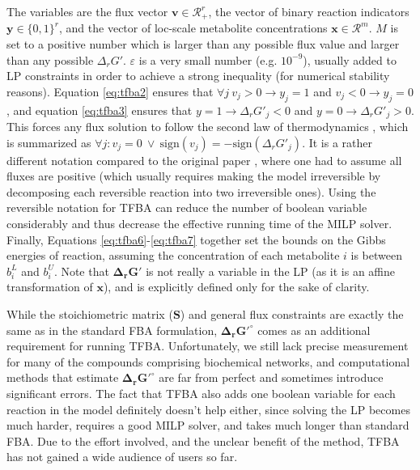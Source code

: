\documentclass[twocolumn]{bmcart}%
\begin{document}
The variables are the flux vector $\mathbf{v} \in \mathcal{R}_{+}^{r}$, the vector of binary reaction indicators $\mathbf{y} \in \{0,1\}^{r}$, and the vector of loc-scale metabolite concentrations $\mathbf{x} \in \mathcal{R}^{m}$. $M$ is set to a positive number which is larger than any possible flux value and larger than any possible $\Delta_r G'$. $\varepsilon$ is a very small number (e.g. $10^{-9}$), usually added to LP constraints in order to achieve a strong inequality (for numerical stability reasons). Equation \ref{eq:tfba2} ensures that $\forall j~v_j > 0 \rightarrow y_j = 1$ and $v_j < 0 \rightarrow y_j = 0$, and equation \ref{eq:tfba3} ensures that $y = 1 \rightarrow \Delta_r G'_j < 0$ and $y = 0 \rightarrow \Delta_r G'_j > 0$. This forces any flux solution to follow the second law of thermodynamics \cite{Hoppe2007-sw, Machado2017-gh}, which is summarized as $\forall j:v_j = 0~\vee~\text{sign}(v_j) = -\text{sign}(\Delta_r G'_j)$. It is a rather different notation compared to the original paper \cite{Henry2007-xp}, where one had to assume all fluxes are positive (which usually requires making the model irreversible by decomposing each reversible reaction into two irreversible ones). Using the reversible notation for TFBA can reduce the number of boolean variable considerably and thus decrease the effective running time of the MILP solver.
Finally, Equations \ref{eq:tfba6}-\ref{eq:tfba7} together set the bounds on the Gibbs energies of reaction, assuming the concentration of each metabolite $i$ is between $b^L_i$ and $b^U_i$. Note that $\mathbf{\Delta_r G'}$ is not really a variable in the LP (as it is an affine transformation of $\mathbf{x}$), and is explicitly defined only for the sake of clarity. 

While the stoichiometric matrix ($\mathbf{S}$) and general flux constraints are exactly the same as in the standard FBA formulation, $\mathbf{\Delta_r G'^\circ}$ comes as an additional requirement for running TFBA. Unfortunately, we still lack precise measurement for many of the compounds comprising biochemical networks, and computational methods that estimate $\mathbf{\Delta_r G'^\circ}$ \cite{Jankowski2008-hd,Noor2012-mp,Noor2013-an,Jinich2014-nv} are far from perfect and sometimes introduce significant errors. The fact that TFBA also adds one boolean variable for each reaction in the model definitely doesn't help either, since solving the LP becomes much harder, requires a good MILP solver, and takes much longer than standard FBA. Due to the effort involved, and the unclear benefit of the method, TFBA has not gained a wide audience of users so far.
\end{document}
